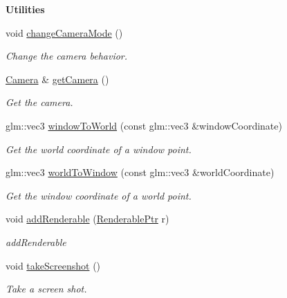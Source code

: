 \begin{Indent}{\bf Utilities}\par
\begin{DoxyCompactItemize}
\item 
void \hyperlink{classViewer_a6dbec13fc3fe0e9b670cd290dd79129f}{change\+Camera\+Mode} ()
\begin{DoxyCompactList}\small\item\em Change the camera behavior. \end{DoxyCompactList}\item 
\hyperlink{classCamera}{Camera} \& \hyperlink{classViewer_aaa4a3ba6d053dd80b5ddce9674dc9223}{get\+Camera} ()
\begin{DoxyCompactList}\small\item\em Get the camera. \end{DoxyCompactList}\item 
glm\+::vec3 \hyperlink{classViewer_a6b1049a4ee9dadb17300466d77a10b33}{window\+To\+World} (const glm\+::vec3 \&window\+Coordinate)
\begin{DoxyCompactList}\small\item\em Get the world coordinate of a window point. \end{DoxyCompactList}\item 
glm\+::vec3 \hyperlink{classViewer_a292d761edf0ab1e7a82e980df5d5d78f}{world\+To\+Window} (const glm\+::vec3 \&world\+Coordinate)
\begin{DoxyCompactList}\small\item\em Get the window coordinate of a world point. \end{DoxyCompactList}\item 
void \hyperlink{classViewer_a20d5c9848fc168114cfa87a0a3644889}{add\+Renderable} (\hyperlink{Renderable_8hpp_af96923590b8eeb9c51882b39815f266b}{Renderable\+Ptr} r)
\begin{DoxyCompactList}\small\item\em add\+Renderable \end{DoxyCompactList}\item 
void \hyperlink{classViewer_a035601318af5f11281aaeb9d067a8bd0}{take\+Screenshot} ()
\begin{DoxyCompactList}\small\item\em Take a screen shot. \end{DoxyCompactList}\end{DoxyCompactItemize}
\end{Indent}
